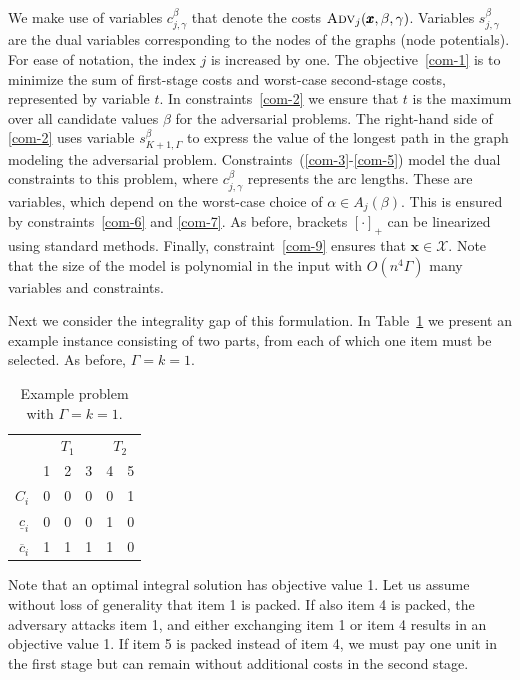 \documentclass[a4paper,11pt,abstracton]{scrartcl}
\theoremstyle{definition}
\theoremstyle{remark}
\newcommand{\X}{\mathcal{X}}
\begin{document}
We make use of variables $c^\beta_{j,\gamma}$ that denote the costs $\textsc{Adv}_j(\pmb{x},\beta,\gamma)$. Variables $s^\beta_{j,\gamma}$ are the dual variables corresponding to the nodes of the graphs (node potentials). For ease of notation, the index $j$ is increased by one.
The objective~\eqref{com-1} is to minimize the sum of first-stage costs and worst-case second-stage costs, represented by variable $t$. In constraints~\eqref{com-2} we ensure that $t$ is the maximum over all candidate values $\beta$ for the adversarial problems. The right-hand side of \eqref{com-2} uses variable $s^\beta_{K+1,\Gamma}$ to express the value of the longest path in the graph modeling the adversarial problem. Constraints~(\ref{com-3}-\ref{com-5}) model the dual constraints to this problem, where $c^\beta_{j,\gamma}$ represents the arc lengths. These are variables, which depend on the worst-case choice of $\alpha\in A_j(\beta)$. This is ensured by constraints~\eqref{com-6} and \eqref{com-7}. As before, brackets $[\cdot]_+$ can be linearized using standard methods. Finally, constraint~\eqref{com-9} ensures that $\pmb{x}\in\X$. Note that the size of the model is polynomial in the input with $O(n^4\Gamma)$ many variables and constraints.

Next we consider the integrality gap of this formulation. In Table~\ref{tab:example2} we present an example instance consisting of two parts, from each of which one item must be selected. As before, $\Gamma=k=1$.
\begin{table}[htb]
\begin{center}
\begin{tabular}{r|rrr|rr}
 & \multicolumn{3}{c|}{$T_1$} & \multicolumn{2}{c}{$T_2$} \\
 & 1 & 2 & 3 & 4 & 5 \\
 \hline
$C_i$ & 0 & 0 & 0 & 0 & 1\\
$\underline{c}_i$ & 0 & 0 & 0 & 1 & 0 \\
$\overline{c}_i$ & 1 & 1 & 1 & 1 & 0
\end{tabular}
\end{center}
\caption{Example problem with $\Gamma=k=1$.\label{tab:example2}}
\end{table}
Note that an optimal integral solution has objective value 1. Let us assume without loss of generality that item 1 is packed. If also item 4 is packed, the adversary attacks item 1, and either exchanging item 1 or item 4 results in an objective value 1. If item 5 is packed instead of item 4, we must pay one unit in the first stage but can remain without additional costs in the second stage.
\end{document}
